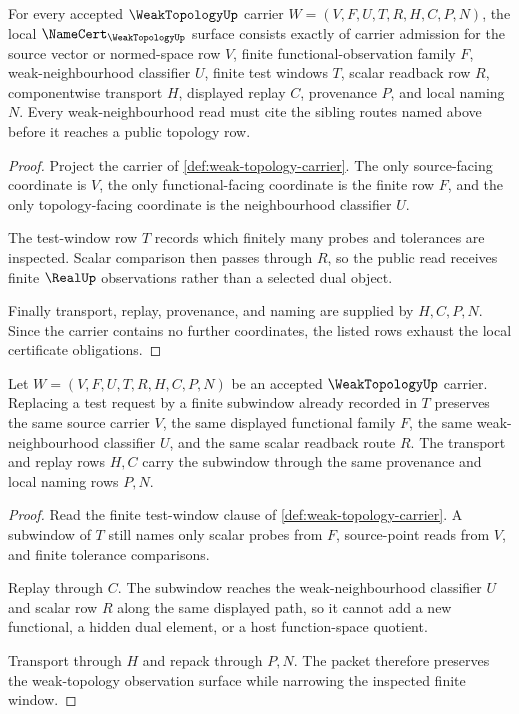 \begin{theorem}
\label{thm:weak-topology-namecert-obligations}
For every accepted $\WeakTopologyUp$ carrier $W=(V,F,U,T,R,H,C,P,N)$, the local $\NameCert_{\WeakTopologyUp}$ surface consists exactly of carrier admission for the source vector or normed-space row $V$, finite functional-observation family $F$, weak-neighbourhood classifier $U$, finite test windows $T$, scalar readback row $R$, componentwise transport $H$, displayed replay $C$, provenance $P$, and local naming $N$. Every weak-neighbourhood read must cite the sibling routes named above before it reaches a public topology row.
\end{theorem}
\begin{proof}
Project the carrier of \autoref{def:weak-topology-carrier}. The only source-facing coordinate is $V$, the only functional-facing coordinate is the finite row $F$, and the only topology-facing coordinate is the neighbourhood classifier $U$.

The test-window row $T$ records which finitely many probes and tolerances are inspected. Scalar comparison then passes through $R$, so the public read receives finite $\RealUp$ observations rather than a selected dual object.

Finally transport, replay, provenance, and naming are supplied by $H,C,P,N$. Since the carrier contains no further coordinates, the listed rows exhaust the local certificate obligations.
\end{proof}

\begin{theorem}
\label{thm:weak-topology-functional-window-stability}
Let $W=(V,F,U,T,R,H,C,P,N)$ be an accepted $\WeakTopologyUp$ carrier. Replacing a test request by a finite subwindow already recorded in $T$ preserves the same source carrier $V$, the same displayed functional family $F$, the same weak-neighbourhood classifier $U$, and the same scalar readback route $R$. The transport and replay rows $H,C$ carry the subwindow through the same provenance and local naming rows $P,N$.
\end{theorem}
\begin{proof}
Read the finite test-window clause of \autoref{def:weak-topology-carrier}. A subwindow of $T$ still names only scalar probes from $F$, source-point reads from $V$, and finite tolerance comparisons.

Replay through $C$. The subwindow reaches the weak-neighbourhood classifier $U$ and scalar row $R$ along the same displayed path, so it cannot add a new functional, a hidden dual element, or a host function-space quotient.

Transport through $H$ and repack through $P,N$. The packet therefore preserves the weak-topology observation surface while narrowing the inspected finite window.
\end{proof}

